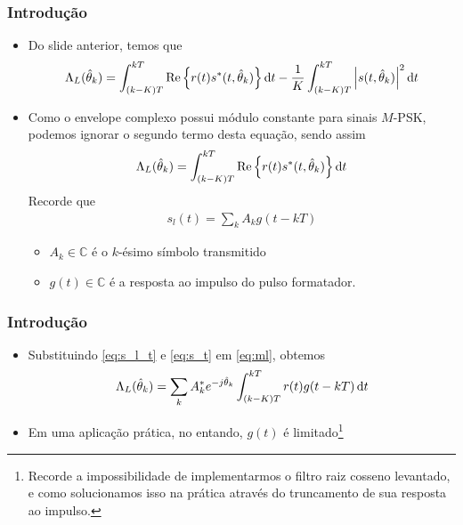 \begin{frame}[t]
	\frametitle{Introdução}
    \begin{itemize}
        \item Do slide anterior, temos que
        \begin{align}
            \Lambda_L(\hat{\theta}_{k}) = \int_{(k-K)T}^{kT} \textnormal{Re}\left\{r(t)s^*(t, \hat{\theta}_{k})\right\} \diff{t} - \frac{1}{K} \int_{(k-K)T}^{kT} \abs{s(t, \hat{\theta}_{k})}^{2} \diff{t}
        \end{align}
        \item Como o envelope complexo possui módulo constante para sinais \(M\)-PSK, podemos ignorar o segundo termo desta equação, sendo assim
        \begin{align}
            \Lambda_L(\hat{\theta}_{k}) = \int_{(k-K)T}^{kT} \textnormal{Re}\left\{r(t)s^*(t, \hat{\theta}_{k})\right\} \diff{t}
            \label{eq:ml}
        \end{align}
        Recorde que
        \begin{align}
            s_l(t) = \sum_k A_k g(t - kT)
            \label{eq:s_l_t}
        \end{align}
        \begin{itemize}
            \item \(A_k \in \mathbb{C}\) é o \(k\)-ésimo símbolo transmitido
            \item \(g(t) \in \mathbb{C}\) é a resposta ao impulso do pulso formatador.
        \end{itemize}
    \end{itemize}
\end{frame}

\begin{frame}[t]
	\frametitle{Introdução}
    \begin{itemize}
        \item Substituindo \eqref{eq:s_l_t} e \eqref{eq:s_t} em \eqref{eq:ml}, obtemos
        \begin{align}
            \Lambda_L(\hat{\theta}_{k}) = \sum_k A^*_k e^{-j\hat{\theta}_{k}} \int_{(k-K)T}^{kT} r(t) g(t - kT) \diff{t}
        \end{align}
        \item Em uma aplicação prática, no entando, \(g(t)\) é limitado\footnote{Recorde a impossibilidade de implementarmos o filtro raiz cosseno levantado, e como solucionamos isso na prática através do truncamento de sua resposta ao impulso.}
    \end{itemize}
\end{frame}

